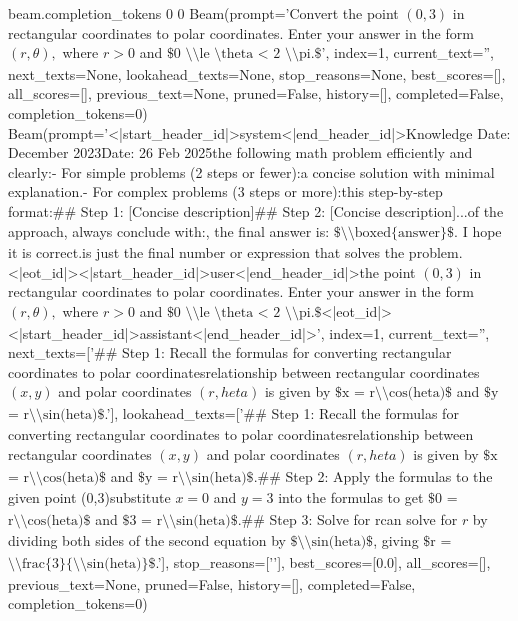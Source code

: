 beam.completion_tokens
0
0
Beam(prompt='Convert the point $(0,3)$ in rectangular coordinates to polar coordinates.  Enter your answer in the form $(r,\theta),$ where $r > 0$ and $0 \\le \theta < 2 \\pi.$', index=1, current_text='', next_texts=None, lookahead_texts=None, stop_reasons=None, best_scores=[], all_scores=[], previous_text=None, pruned=False, history=[], completed=False, completion_tokens=0)
Beam(prompt='<|start_header_id|>system<|end_header_id|>\n\nCutting Knowledge Date: December 2023\nToday Date: 26 Feb 2025\n\nSolve the following math problem efficiently and clearly:\n\n- For simple problems (2 steps or fewer):\nProvide a concise solution with minimal explanation.\n\n- For complex problems (3 steps or more):\nUse this step-by-step format:\n\n## Step 1: [Concise description]\n\n## Step 2: [Concise description]\n\n...\n\nRegardless of the approach, always conclude with:\n\nTherefore, the final answer is: $\\boxed{answer}$. I hope it is correct.\n\nWhere [answer] is just the final number or expression that solves the problem.<|eot_id|><|start_header_id|>user<|end_header_id|>\n\nConvert the point $(0,3)$ in rectangular coordinates to polar coordinates.  Enter your answer in the form $(r,\theta),$ where $r > 0$ and $0 \\le \theta < 2 \\pi.$<|eot_id|><|start_header_id|>assistant<|end_header_id|>\n\n', index=1, current_text='', next_texts=['## Step 1: Recall the formulas for converting rectangular coordinates to polar coordinates\nThe relationship between rectangular coordinates $(x,y)$ and polar coordinates $(r,heta)$ is given by $x = r\\cos(heta)$ and $y = r\\sin(heta)$.\n\n'], lookahead_texts=['## Step 1: Recall the formulas for converting rectangular coordinates to polar coordinates\nThe relationship between rectangular coordinates $(x,y)$ and polar coordinates $(r,heta)$ is given by $x = r\\cos(heta)$ and $y = r\\sin(heta)$.\n\n## Step 2: Apply the formulas to the given point (0,3)\nWe substitute $x = 0$ and $y = 3$ into the formulas to get $0 = r\\cos(heta)$ and $3 = r\\sin(heta)$.\n\n## Step 3: Solve for r\nWe can solve for $r$ by dividing both sides of the second equation by $\\sin(heta)$, giving $r = \\frac{3}{\\sin(heta)}$.\n\n'], stop_reasons=['\n\n'], best_scores=[0.0], all_scores=[], previous_text=None, pruned=False, history=[], completed=False, completion_tokens=0)

